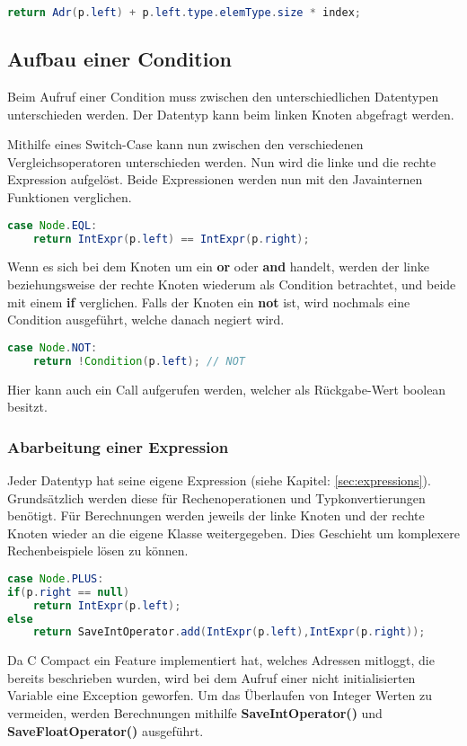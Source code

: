 \begin{lstlisting}[language=JAVA]
return Adr(p.left) + p.left.type.elemType.size * index;
\end{lstlisting}

\subsection{Aufbau einer Condition}
Beim Aufruf einer Condition muss zwischen den unterschiedlichen Datentypen unterschieden werden. Der Datentyp kann beim linken Knoten abgefragt werden.

Mithilfe eines Switch-Case kann nun zwischen den verschiedenen Vergleichsoperatoren unterschieden werden. Nun wird die linke und die rechte Expression aufgelöst. Beide Expressionen werden nun mit den Javainternen Funktionen verglichen. 
\begin{lstlisting}[language=JAVA]
case Node.EQL:
	return IntExpr(p.left) == IntExpr(p.right);
\end{lstlisting}

Wenn es sich bei dem Knoten um ein \textbf{or} oder \textbf{and} handelt, werden der linke beziehungsweise der rechte Knoten wiederum als Condition betrachtet, und beide mit einem \textbf{if} verglichen. Falls der Knoten ein \textbf{not} ist, wird nochmals eine Condition ausgeführt, welche danach negiert wird.
\begin{lstlisting}[language=JAVA]
case Node.NOT:
	return !Condition(p.left); // NOT
\end{lstlisting}

Hier kann auch ein Call aufgerufen werden, welcher als Rückgabe-Wert boolean besitzt.

\subsubsection{Abarbeitung einer Expression}
Jeder Datentyp hat seine eigene Expression (siehe Kapitel: \ref{sec:expressions}). Grundsätzlich werden diese für Rechenoperationen und Typkonvertierungen benötigt. Für Berechnungen werden jeweils der linke Knoten und der rechte Knoten wieder an die eigene Klasse weitergegeben. Dies Geschieht um komplexere Rechenbeispiele lösen zu können. 
\begin{lstlisting}[language=JAVA]
case Node.PLUS:
if(p.right == null)
	return IntExpr(p.left);
else
	return SaveIntOperator.add(IntExpr(p.left),IntExpr(p.right));
\end{lstlisting}

Da C Compact ein Feature implementiert hat, welches Adressen mitloggt, die bereits beschrieben wurden, wird bei dem Aufruf einer nicht initialisierten Variable eine Exception geworfen. Um das Überlaufen von Integer Werten zu vermeiden, werden Berechnungen mithilfe \textbf{SaveIntOperator()} und \textbf{SaveFloatOperator()} ausgeführt.


